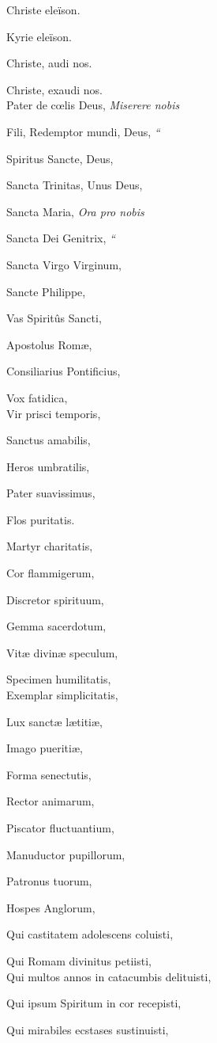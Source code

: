 Christe eleïson.

Kyrie eleïson.

Christe, audi nos.

Christe, exaudi nos.\emph{}\\
Pater de cœlis Deus,
\emph{Miserere nobis}

Fili, Redemptor mundi, Deus,
\emph{``}

Spiritus Sancte, Deus,

Sancta Trinitas, Unus Deus,

Sancta Maria,
\emph{Ora pro nobis}

Sancta Dei Genitrix,
\emph{``}

Sancta Virgo Virginum,

Sancte Philippe,

Vas Spiritûs Sancti,

Apostolus Romæ,

Consiliarius Pontificius,

Vox fatidica,\emph{}\\
Vir prisci temporis,

Sanctus amabilis,

Heros umbratilis,

Pater suavissimus,

Flos puritatis.

Martyr charitatis,

Cor flammigerum, 

Discretor spirituum,

Gemma sacerdotum,

Vitæ divinæ speculum,

Specimen humilitatis,\emph{}\\
Exemplar simplicitatis,

Lux sanctæ lætitiæ,

Imago pueritiæ,

Forma senectutis,

Rector animarum,

Piscator fluctuantium,

Manuductor pupillorum,

Patronus tuorum,

Hospes Anglorum,

Qui castitatem adolescens coluisti,

Qui Romam divinitus petiisti,\emph{}\\
Qui multos annos in catacumbis delituisti,

Qui ipsum Spiritum in cor recepisti,

Qui mirabiles ecstases sustinuisti,

